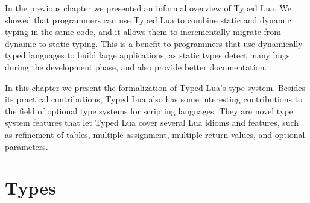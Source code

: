 
In the previous chapter we presented an informal overview of Typed Lua.
We showed that programmers can use Typed Lua to combine static and dynamic
typing in the same code, and it allows them to incrementally migrate from
dynamic to static typing.
This is a benefit to programmers that use dynamically typed languages
to build large applications, as static types detect many bugs
during the development phase, and also provide better documentation.

In this chapter we present the formalization of Typed Lua's type system.
Besides its practical contributions, Typed Lua also has some interesting
contributions to the field of optional type systems for scripting
languages.
They are novel type system features that let Typed Lua cover several Lua idioms
and features, such as refinement of tables, multiple assignment, multiple return values,
and optional parameters.

\section{Types}
\label{sec:types}

